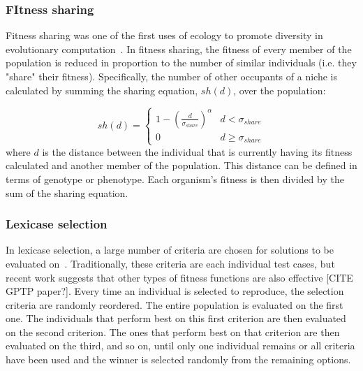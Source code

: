 \subsubsection{FItness sharing}

Fitness sharing was one of the first uses of ecology to promote diversity in evolutionary computation~\cite{goldberg_genetic_1987}. In fitness sharing, the fitness of every member of the population is reduced in proportion to the number of similar individuals (i.e. they "share" their fitness). Specifically, the number of other occupants of a niche is calculated by summing the sharing equation, $sh(d)$, over the population:

\begin{equation} sh(d) =    \begin{cases}
      1 - (\frac{d}{\sigma_{share}})^{\alpha} & d < \sigma_{share}\\
      0 &  d \geq \sigma_{share}  
   \end{cases}
\label{eq:fit_share}
\end{equation}
where $d$ is the distance between the individual that is currently having its fitness calculated and another member of the population. This distance can be defined in terms of genotype or phenotype.  Each organism's fitness is then divided by the sum of the sharing equation.

\subsubsection{Lexicase selection}

In lexicase selection, a large number of criteria are chosen for solutions to be evaluated on~\cite{spector_assessment_2012}. Traditionally, these criteria are each individual test cases, but recent work suggests that other types of fitness functions are also effective [CITE GPTP paper?]. Every time an individual is selected to reproduce, the selection criteria are randomly reordered. The entire population is evaluated on the first one. The individuals that perform best on this first criterion are then evaluated on the second criterion. The ones that perform best on that criterion are then evaluated on the third, and so on, until only one individual remains or all criteria have been used and the winner is selected randomly from the remaining options.

